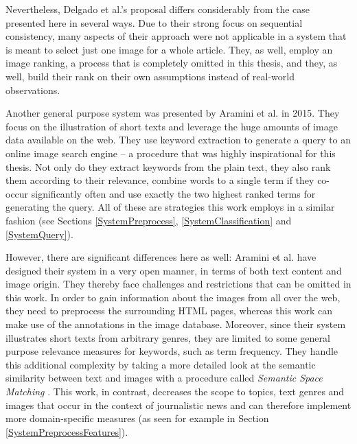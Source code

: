 \documentclass[11pt,a4paper,twoside]{article}
\begin{document}
Nevertheless, Delgado et al.'s proposal differs considerably from the case presented here in several ways. Due to their strong focus on sequential consistency, many aspects of their approach were not applicable in a system that is meant to select just one image for a whole article. They, as well, employ an image ranking, a process that is completely omitted in this thesis, and they, as well, build their rank on their own assumptions instead of real-world observations.

\bigskip

Another general purpose system was presented by Aramini et al. in 2015. \cite{Aramini2015AutomaticImages} They focus on the illustration of short texts and leverage the huge amounts of image data available on the web. They use keyword extraction to generate a query to an online image search engine -- a procedure that was highly inspirational for this thesis. Not only do they extract keywords from the plain text, they also rank them according to their relevance, combine words to a single term if they co-occur significantly often and use exactly the two highest ranked terms for generating the query. All of these are strategies this work employs in a similar fashion (see Sections \ref{SystemPreprocess}, \ref{SystemClassification} and \ref{SystemQuery}).

However, there are significant differences here as well: Aramini et al. have designed their system in a very open manner, in terms of both text content and image origin. They thereby face challenges and restrictions that can be omitted in this work. In order to gain information about the images from all over the web, they need to preprocess the surrounding HTML pages, whereas this work can make use of the annotations in the image database. Moreover, since their system illustrates short texts from arbitrary genres, they are limited to some general purpose relevance measures for keywords, such as term frequency. They handle this additional complexity by taking a more detailed look at the semantic similarity between text and images with a procedure called \emph{Semantic Space Matching} \cite[pp. 140-144]{Aramini2015AutomaticImages}. This work, in contrast, decreases the scope to topics, text genres and images that occur in the context of journalistic news and can therefore implement more domain-specific measures (as seen for example in Section \ref{SystemPreprocessFeatures}).

\bigskip
\end{document}
